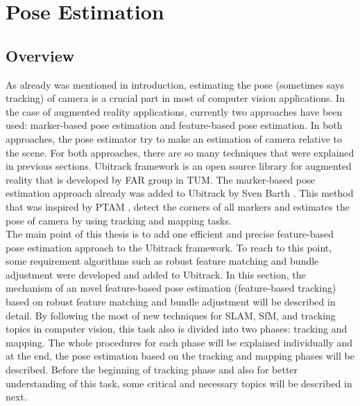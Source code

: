 \chapter{Pose Estimation}\label{chapter:Pose Estimation}
\section{Overview}
As already was mentioned in introduction, estimating the pose (sometimes says tracking) of camera is a crucial part in most of computer vision applications. In the case of augmented reality applications, currently two approaches have been used: marker-based pose estimation and feature-based pose estimation. In both approaches, the pose estimator try to make an estimation of camera relative to the scene. For both approaches, there are so many techniques that were explained in previous sections. Ubitrack framework is an open source library for augmented reality that is developed by FAR group in TUM. The marker-based pose estimation approach already was added to Ubitrack by Sven Barth \cite{barth2014marker}. This method that was inspired by PTAM \cite{klein2007parallel}, detect the corners of all markers and estimates the pose of camera by using tracking and mapping tasks.\\
The main point of this thesis is to add one efficient and precise feature-based pose estimation approach to the Ubitrack framework. To reach to this point, some requirement algorithms such as robust feature matching and bundle adjustment were developed and added to Ubitrack. In this section, the mechanism of an novel feature-based pose estimation (feature-based tracking) based on robust feature matching and bundle adjustment will be described in detail. By following the most of new techniques for SLAM, SfM, and tracking topics in computer vision, this task also is divided into two phases: tracking and mapping. The whole procedures for each phase will be explained individually and at the end, the pose estimation based on the tracking and mapping phases will be described. Before the beginning of tracking phase and also for better understanding of this task, some critical and necessary topics will be described in next.

